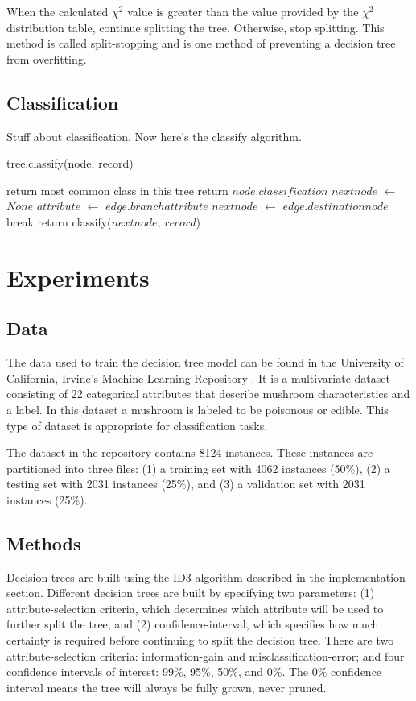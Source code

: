 \documentclass{IEEEtran}
\begin{document}
When the calculated $\chi^2$ value is greater than the value provided by
the $\chi^2$ distribution table, continue splitting the tree. Otherwise,
stop splitting. This method is called split-stopping and is one method
of preventing a decision tree from overfitting.


\subsection{Classification}
Stuff about classification. Now here's the classify algorithm.
\begin{algorithm}
\caption{tree.classify(node, record)}
\begin{algorithmic}
  \State return most common class in this tree
\EndIf
{}
  \State return $node.classification$
\EndIf
\State $nextnode$ $\leftarrow$ $None$
  \State $attribute$ $\leftarrow$ $edge.branchattribute$
    \State $nextnode$ $\leftarrow$ $edge.destinationnode$
    \State break
  \EndIf
\EndFor
\State return classify($nextnode$, $record$)
\end{algorithmic}
\end{algorithm}

\section{Experiments}
\subsection{Data}
The data used to train the decision tree model can be found in the
University of California, Irvine's Machine Learning
Repository \parencite{schlimmer1981mushroom}. It is a multivariate dataset
consisting of 22 categorical attributes that describe mushroom
characteristics and a label. In this dataset a mushroom is labeled to
be poisonous or edible. This type of dataset is appropriate for
classification tasks.

The dataset in the repository contains 8124 instances. These instances
are partitioned into three files: (1) a training set with 4062 instances
(50\%), (2) a testing set with 2031 instances (25\%), and (3) a
validation set with 2031 instances (25\%).

\subsection{Methods}
Decision trees are built using the ID3 algorithm described in the
implementation section. Different decision trees are built by
specifying two parameters: (1) attribute-selection criteria, which
determines which attribute will be used to further split the tree, and (2)
confidence-interval, which specifies how much certainty is required before
continuing to split the decision tree.  There are two
attribute-selection criteria: information-gain and
misclassification-error; and four confidence intervals of interest:
99\%,  95\%, 50\%, and 0\%. The 0\% confidence interval means the tree
will always be fully grown, never pruned.
\end{document}
